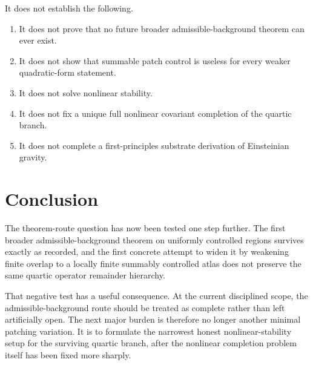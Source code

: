 \documentclass[11pt]{article}
\begin{document}
It does not establish the following.
\begin{enumerate}
    \item It does not prove that no future broader admissible-background theorem can ever exist.
    \item It does not show that summable patch control is useless for every weaker quadratic-form statement.
    \item It does not solve nonlinear stability.
    \item It does not fix a unique full nonlinear covariant completion of the quartic branch.
    \item It does not complete a first-principles substrate derivation of Einsteinian gravity.
\end{enumerate}

\section{Conclusion}

The theorem-route question has now been tested one step further. The first broader admissible-background theorem on uniformly controlled regions survives exactly as recorded, and the first concrete attempt to widen it by weakening finite overlap to a locally finite summably controlled atlas does not preserve the same quartic operator remainder hierarchy.

That negative test has a useful consequence. At the current disciplined scope, the admissible-background route should be treated as complete rather than left artificially open. The next major burden is therefore no longer another minimal patching variation. It is to formulate the narrowest honest nonlinear-stability setup for the surviving quartic branch, after the nonlinear completion problem itself has been fixed more sharply.
\end{document}
